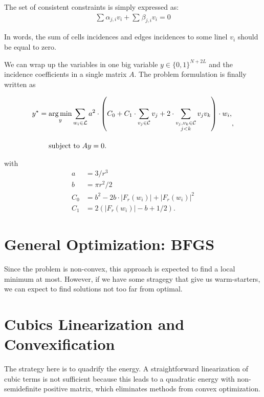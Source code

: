 	The set of consistent constraints is simply expressed as:
	\begin{align*}
		\sum_{}{\alpha_{j,i}v_i} + \sum_{}{\beta_{j,i}v_i} = 0
	\end{align*}
	
	In words, the sum of cells incidences and edges incidences to some linel $v_i$ should be equal to zero. 
	
	We can wrap up the variables in one big variable $y \in \{0,1\}^{N+2L}$ and the incidence coefficients in a single matrix $A$. The problem formulation is finally written as


	\begin{equation}
	\begin{aligned}
		y^\star &= \operatorname*{arg\,min}_{y} \sum_{w_i \in \mathcal{L}}{ a^2 \cdot \left( C_0 + C_1 \cdot \sum_{v_j \in \mathcal{C}}{v_j} + 2 \cdot \sum_{ \substack{v_j,v_k \in \mathcal{C} \\ j<k} }{v_jv_k}  \right) } \cdot w_i,\\[1em]
	&\quad \text{ subject to } Ay=0.
	\end{aligned},
	\label{eq:global-formulation}
	\end{equation}
	
	with 
	\begin{align*}
		a &= 3/r^3 \\ 
		b &= \pi r^2/2 \\ 
		C_0 &= b^2 - 2b \cdot |F_r(w_i)| + |F_r(w_i)|^2 \\
		C_1 &= 2\left( |F_r(w_i)| - b + 1/2 \right).
	\end{align*}


\section{General Optimization: BFGS}
Since the problem is non-convex, this approach is expected to find a local minimum at most. However, if we have some stragegy that give us warm-starters, we can expect to find solutions not too far from optimal.

\section{Cubics Linearization and Convexification}
The strategy here is to quadrify the energy. A straightforward linearization of cubic terms is not sufficient because this leads to a quadratic energy with non-semidefinite positive matrix, which eliminates methods from convex optimization.

